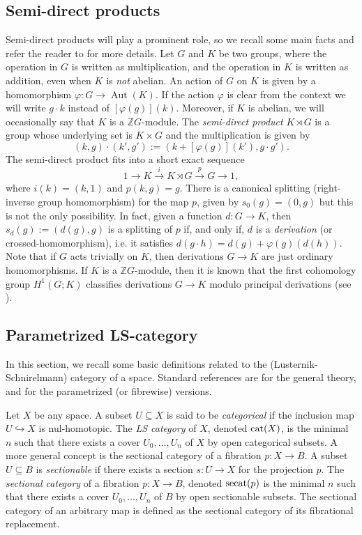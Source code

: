 \documentclass[11pt]{amsart}
\theoremstyle{plain}
\theoremstyle{definition}
\newcommand{\ZZ}{{\mathbb{Z}}}
\newcommand{\cat}{\mathop{\rm cat}\nolimits}
\newcommand{\secat}{\mathop{\rm secat}\nolimits}
\DeclareMathOperator{\Aut}{Aut}
\begin{document}
\subsection{Semi-direct products}
Semi-direct products will play a prominent role, so we recall some main facts and refer the reader to 
\cite[Ch. IV]{Brown} for more details. Let $G$ and $K$ be two groups, where the operation in $G$ 
is written as multiplication, and the operation in $K$ is written as addition, even when $K$ 
is \textit{not} abelian. An action of $G$ on $K$ is given by a homomorphism $\varphi\colon G\to\Aut(K)$. 
If the action $\varphi$ is clear from the context we will write $g\cdot k$ instead of 
$[\varphi(g)](k)$. Moreover, if $K$ is abelian, we will occasionally 
say that $K$ is a $\ZZ G$-module.
The \emph{semi-direct product} $K\rtimes G$ is a group whose 
underlying set is $K\times G$ and the multiplication is given by
$$(k,g)\cdot (k',g'):=(k+[\varphi(g)](k'),g\cdot g').$$
The semi-direct product fits into a short exact sequence 
$$1 \to K \xrightarrow{i} K \rtimes G \xrightarrow{p} G \to 1,$$
where $i(k)=(k,1)$ and $p(k,g)=g$. There is a canonical splitting (right-inverse group homomorphism) 
for the map $p$, given by $s_0(g)=(0,g)$ but this is not the only possibility. 
In fact, given a function $d\colon G\to K$, then 
$s_d(g):=(d(g),g)$ is a splitting of $p$ if, and only if, $d$ is a \emph{derivation} (or crossed-homomorphism), 
i.e. it satisfies $d(g\cdot h)=d(g)+\varphi(g)(d(h))$. Note that if $G$ acts trivially on $K$, then derivations
$G\to K$ are just ordinary homomorphisms. If $K$ is a $\ZZ G$-module, then it is known that 
the first cohomology group $H^1(G;K)$ classifies derivations $G\to K$ modulo principal derivations
(see \cite[Prop. 2.3]{Brown}).


\subsection{Parametrized LS-category} In this section, we recall some basic definitions  
related to the (Lusternik-Schnirelmann) category of a space. Standard references are \cite{CLOT}
for the general theory, and \cite{Garcia-Calcines2014} for the parametrized (or fibrewise) versions.

Let $X$ be any space. A subset $U\subseteq X$ is said to be \emph{categorical} if the inclusion
map $U\hookrightarrow X$ is nul-homotopic. The \emph{LS category} of $X$, denoted $\cat(X)$, 
is the minimal $n$ such that 
there exists a cover $U_0,\ldots,U_n$ of $X$ by open categorical subsets. A more general 
concept is the sectional category of a fibration $p\colon X\to B$. A subset $U\subseteq B$ is 
\emph{sectionable} if there exists a section $s\colon U\to X$ for the projection $p$. 
The \emph{sectional category} of a fibration $p\colon X\to B$, denoted $\secat(p)$ 
is the minimal $n$ such that
there exists a cover $U_0,\ldots,U_n$ of $B$ by open sectionable subsets. 
The sectional category of an arbitrary map is defined as the sectional category of its fibrational replacement.
\end{document}
